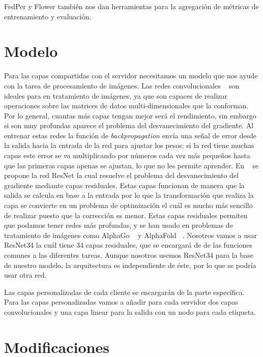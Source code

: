 FedPer y Flower también nos dan herramientas para la agregación de métricas de entrenamiento y evaluación.

\newpage

\section{Modelo}

Para las capas compartidas con el servidor necesitamos un modelo que nos ayude con la tarea de procesamiento de imágenes. Las redes convolucionales ~\cite{10.3389/fncom.2023.1153572} son ideales para en tratamiento de imágenes, ya que son capaces de realizar operaciones sobre las matrices de datos multi-dimensionales que la conforman. Por lo general, cuantas más capas tengan mejor será el rendimiento, sin embargo si son muy profundas aparece el problema del desvanecimiento del gradiente. Al entrenar estas redes la función de \textit{backpropagation} envía una señal de error desde la salida hacia la entrada de la red para ajustar los pesos; si la red tiene muchas capas este error se va multiplicando por números cada vez más pequeños hasta que las primeras capas apenas se ajustan, lo que no les permite aprender. En ~\cite{he2015deepresiduallearningimage} se propone la red ResNet la cual resuelve el problema del desvanecimiento del gradiente mediante capas residuales. Estas capas funcionan de manera que la salida se calcula en base a la entrada por lo que la transformación que realiza la capa se convierte en un problema de optimización el cuál es mucho más sencillo de realizar puesto que la corrección es menor. Estas capas residuales permiten que podamos tener redes más profundas, y se han usado en problemas de tratamiento de imágenes como AlphaGo ~\cite{alphago} y AlphaFold ~\cite{alphafold}. Nosotros vamos a usar ResNet34 la cuál tiene 34 capas residuales, que se encargará de de las funciones comunes a las diferentes tareas. Aunque nosotros usemos ResNet34 para la base de nuestro modelo, la arquitectura es independiente de éste, por lo que se podría usar otra red.

Las capas personalizadas de cada cliente se encargarán de la parte específica. Para las capas personalizadas vamos a añadir para cada servidor dos capas convolucionales y una capa linear para la salida con un nodo para cada etiqueta.

\section{Modificaciones}

